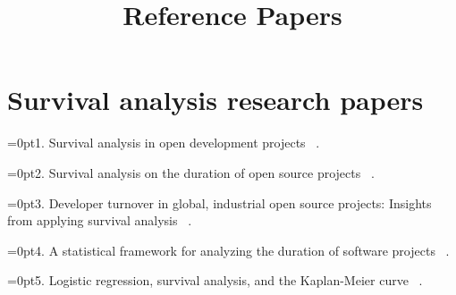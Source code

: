 \documentclass{article}
\title{Reference Papers}
\begin{document}
\maketitle
\section*{Survival analysis research papers}
\parindent=0pt1. Survival analysis in open development projects ~\cite{ortega2009survival}.

\parindent=0pt2. Survival analysis on the duration of open source projects ~\cite{samoladas2010survival}.

\parindent=0pt3. Developer turnover in global, industrial open source projects: Insights from applying survival analysis ~\cite{lin2017developer}.

\parindent=0pt4. A statistical framework for analyzing the duration of software projects
~\cite{sentas2008statistical}.

\parindent=0pt5. Logistic regression, survival analysis, and the Kaplan-Meier curve
~\cite{efron1988logistic}.



\end{document}

